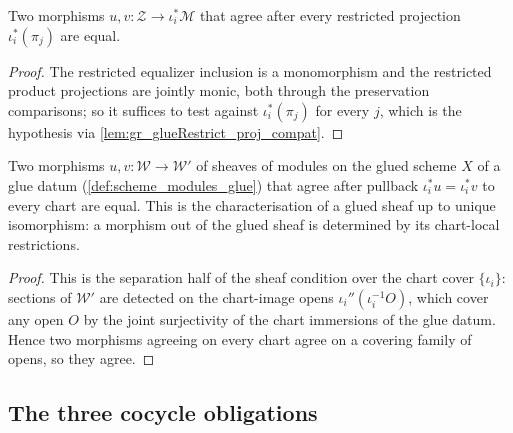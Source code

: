 \begin{lemma}\leanok
  \label{lem:gr_glueRestrict_hom_ext}
  Two morphisms \(u, v : \mathcal{Z} \to \iota_i^{*}\mathcal{M}\) that agree after every
  restricted projection \(\iota_i^{*}(\pi_j)\) are equal.
\end{lemma}
\begin{proof}
  \leanok
  The restricted equalizer inclusion is a monomorphism and the restricted product
  projections are jointly monic, both through the preservation comparisons; so it
  suffices to test against \(\iota_i^{*}(\pi_j)\) for every \(j\), which is the
  hypothesis via \cref{lem:gr_glueRestrict_proj_compat}.
\end{proof}

\begin{lemma}\leanok
  \label{lem:gr_modules_glue_unique}
  Two morphisms \(u, v : \mathcal{W} \to \mathcal{W}'\) of sheaves of modules on the glued
  scheme \(X\) of a glue datum (\cref{def:scheme_modules_glue}) that agree after pullback
  \(\iota_i^{*}u = \iota_i^{*}v\) to every chart are equal. This is the characterisation of a
  glued sheaf up to unique isomorphism: a morphism out of the glued sheaf is determined by its
  chart-local restrictions.
\end{lemma}
\begin{proof}
  \leanok
  This is the separation half of the sheaf condition over the chart cover \(\{\iota_i\}\):
  sections of \(\mathcal{W}'\) are detected on the chart-image opens \(\iota_i''(\iota_i^{-1}O)\),
  which cover any open \(O\) by the joint surjectivity of the chart immersions of the glue
  datum. Hence two morphisms agreeing on every chart agree on a covering family of opens, so
  they agree.
\end{proof}

\subsection{The three cocycle obligations}

